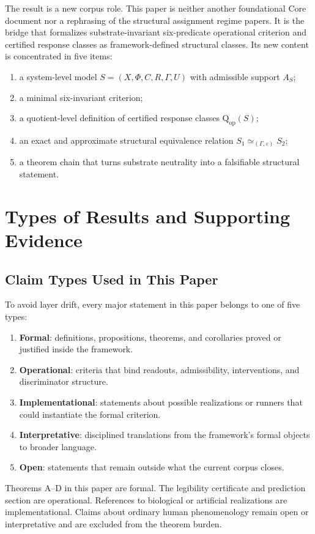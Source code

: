 \documentclass[11pt,a4paper]{article}
\theoremstyle{definition}
\newcommand{\Qop}{\mathrm{Q}_{\mathrm{op}}}
\newcommand{\Aset}{A_S}
\newcommand{\eps}{\varepsilon}
\begin{document}
The result is a new corpus role. This paper is neither another foundational Core document nor a rephrasing of the structural assignment regime papers. It is the bridge that formalizes substrate-invariant six-predicate operational criterion and certified response classes as framework-defined structural classes. Its new content is concentrated in five items:
\begin{enumerate}[leftmargin=1.5em]
\item a system-level model $S=(X,\Phi,C,R,\Gamma,U)$ with admissible support $\Aset$;
\item a minimal six-invariant criterion;
\item a quotient-level definition of certified response classes $\Qop(S)$;
\item an exact and approximate structural equivalence relation $S_1 \simeq_{(\Gamma,\eps)} S_2$;
\item a theorem chain that turns substrate neutrality into a falsifiable structural statement.
\end{enumerate}

\section{Types of Results and Supporting Evidence}
\subsection{Claim Types Used in This Paper}
To avoid layer drift, every major statement in this paper belongs to one of five types:
\begin{enumerate}[leftmargin=1.5em]
\item \textbf{Formal}: definitions, propositions, theorems, and corollaries proved or justified inside the framework.
\item \textbf{Operational}: criteria that bind readouts, admissibility, interventions, and discriminator structure.
\item \textbf{Implementational}: statements about possible realizations or runners that could instantiate the formal criterion.
\item \textbf{Interpretative}: disciplined translations from the framework's formal objects to broader language.
\item \textbf{Open}: statements that remain outside what the current corpus closes.
\end{enumerate}
Theorems A--D in this paper are formal. The legibility certificate and prediction section are operational. References to biological or artificial realizations are implementational. Claims about ordinary human phenomenology remain open or interpretative and are excluded from the theorem burden.
\end{document}
